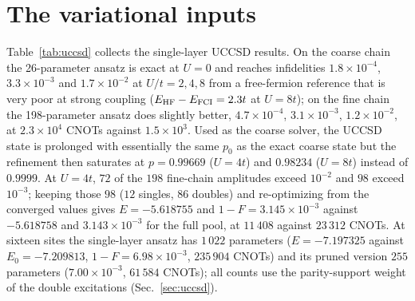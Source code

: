 \documentclass[a4paper,11pt,noarxiv]{quantumarticle}
\begin{document}
\section{The variational inputs}
\label{sm:uccsd}
Table~\ref{tab:uccsd} collects the single-layer UCCSD results.  On the
coarse chain the 26-parameter ansatz is exact at $U=0$ and reaches
infidelities $1.8\times10^{-4}$, $3.3\times10^{-3}$ and $1.7\times10^{-2}$
at $U/t=2,4,8$ from a free-fermion reference that is very poor at strong
coupling ($E_{\rm HF}-E_{\rm FCI}=2.3t$ at $U=8t$); on the fine chain the
198-parameter ansatz does slightly better, $4.7\times10^{-4}$,
$3.1\times10^{-3}$, $1.2\times10^{-2}$, at $2.3\times10^4$ CNOTs against
$1.5\times10^3$.  Used as the coarse solver, the UCCSD state is prolonged
with essentially the same $p_0$ as the exact coarse state but the
refinement then saturates at $p=0.99669$ ($U=4t$) and $0.98234$ ($U=8t$)
instead of $0.9999$.  At $U=4t$, $72$ of the $198$ fine-chain amplitudes
exceed $10^{-2}$ and $98$ exceed $10^{-3}$; keeping those $98$ ($12$
singles, $86$ doubles) and re-optimizing from the converged values gives
$E=-5.618755$ and $1-F=3.145\times10^{-3}$ against $-5.618758$ and
$3.143\times10^{-3}$ for the full pool, at $11\,408$ against $23\,312$
CNOTs.  At sixteen sites the single-layer ansatz has $1\,022$ parameters
($E=-7.197325$ against $E_0=-7.209813$, $1-F=6.98\times10^{-3}$,
$235\,904$ CNOTs) and its pruned version $255$ parameters
($7.00\times10^{-3}$, $61\,584$ CNOTs); all counts use the parity-support
weight of the double excitations (Sec.~\ref{sec:uccsd}).
\end{document}
